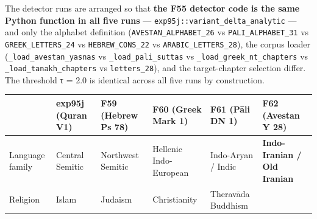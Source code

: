 \documentclass[
]{article}
\newcounter{none} %
\begin{document}
The detector runs are arranged so that \textbf{the F55 detector code is
the same Python function in all five runs} ---
\texttt{exp95j::variant\_delta\_analytic} --- and only the alphabet
definition (\texttt{AVESTAN\_ALPHABET\_26} vs
\texttt{PALI\_ALPHABET\_31} vs \texttt{GREEK\_LETTERS\_24} vs
\texttt{HEBREW\_CONS\_22} vs \texttt{ARABIC\_LETTERS\_28}), the corpus
loader (\texttt{\_load\_avestan\_yasnas} vs
\texttt{\_load\_pali\_suttas} vs \texttt{\_load\_greek\_nt\_chapters} vs
\texttt{\_load\_tanakh\_chapters} vs \texttt{letters\_28}), and the
target-chapter selection differ. The threshold τ = 2.0 is identical
across all five runs by construction.

{\def\LTcaptype{none} %
\begin{longtable}[]{@{}
  >{\raggedright\arraybackslash}p{}
  >{\raggedright\arraybackslash}p{}
  >{\raggedright\arraybackslash}p{}
  >{\raggedright\arraybackslash}p{}
  >{\raggedright\arraybackslash}p{}
  >{\raggedright\arraybackslash}p{}@{}}
\toprule\noalign{}
\begin{minipage}[b]{\linewidth}\raggedright
\end{minipage} & \begin{minipage}[b]{\linewidth}\raggedright
exp95j (Quran V1)
\end{minipage} & \begin{minipage}[b]{\linewidth}\raggedright
F59 (Hebrew Ps 78)
\end{minipage} & \begin{minipage}[b]{\linewidth}\raggedright
F60 (Greek Mark 1)
\end{minipage} & \begin{minipage}[b]{\linewidth}\raggedright
F61 (Pāli DN 1)
\end{minipage} & \begin{minipage}[b]{\linewidth}\raggedright
\textbf{F62 (Avestan Y 28)}
\end{minipage} \\
\midrule\noalign{}
\endhead
\bottomrule\noalign{}
\endlastfoot
Language family & Central Semitic & Northwest Semitic & Hellenic
Indo-European & Indo-Aryan / Indic & \textbf{Indo-Iranian / Old
Iranian} \\
Religion & Islam & Judaism & Christianity & Theravāda Buddhism &

\end{longtable}}
\end{document}
